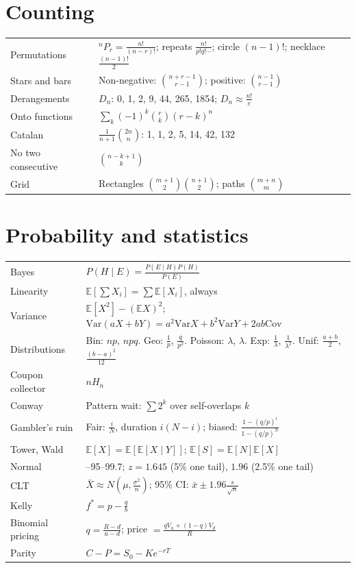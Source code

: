 \documentclass[11pt,a4paper,openany]{report}
\newcommand{\C}[2]{\binom{#1}{#2}}
\newcommand{\E}{\mathbb{E}}
\begin{document}
\section*{Counting}
\begin{tabular}{>{\raggedright}p{5.4cm}>{\raggedright\arraybackslash}p{9.6cm}}
\toprule
Permutations & $^nP_r=\frac{n!}{(n-r)!}$; repeats $\frac{n!}{p!q!\cdots}$; circle $(n-1)!$; necklace $\frac{(n-1)!}2$\\
Stars and bars & Non-negative: $\C{n+r-1}{r-1}$; positive: $\C{n-1}{r-1}$\\
Derangements & $D_n$: 0, 1, 2, 9, 44, 265, 1854; $D_n\approx\frac{n!}e$\\
Onto functions & $\sum_k(-1)^k\C rk(r-k)^n$\\
Catalan & $\frac1{n+1}\C{2n}n$: 1, 1, 2, 5, 14, 42, 132\\
No two consecutive & $\C{n-k+1}k$\\
Grid & Rectangles $\C{m+1}2\C{n+1}2$; paths $\C{m+n}m$\\
\bottomrule
\end{tabular}

\section*{Probability and statistics}
\begin{tabular}{>{\raggedright}p{5.4cm}>{\raggedright\arraybackslash}p{9.6cm}}
\toprule
Bayes & $P(H\mid E)=\frac{P(E\mid H)P(H)}{P(E)}$\\
Linearity & $\E[\sum X_i]=\sum\E[X_i]$, always\\
Variance & $\E[X^2]-(\E X)^2$; $\text{Var}(aX+bY)=a^2\text{Var}X+b^2\text{Var}Y+2ab\text{Cov}$\\
Distributions & Bin: $np$, $npq$. Geo: $\frac1p$, $\frac q{p^2}$. Poisson: $\lambda$, $\lambda$. Exp: $\frac1\lambda$, $\frac1{\lambda^2}$. Unif: $\frac{a+b}2$, $\frac{(b-a)^2}{12}$\\
Coupon collector & $nH_n$\\
Conway & Pattern wait: $\sum 2^k$ over self-overlaps $k$\\
Gambler's ruin & Fair: $\frac iN$, duration $i(N-i)$; biased: $\frac{1-(q/p)^i}{1-(q/p)^N}$\\
Tower, Wald & $\E[X]=\E[\E[X\mid Y]]$; $\E[S]=\E[N]\E[X]$\\
Normal & 68--95--99.7; $z=1.645$ (5\% one tail), $1.96$ (2.5\% one tail)\\
CLT & $\bar X\approx N(\mu,\frac{\sigma^2}n)$; 95\% CI: $\bar x\pm1.96\frac s{\sqrt n}$\\
Kelly & $f^*=p-\frac qb$\\
Binomial pricing & $q=\frac{R-d}{u-d}$; price $=\frac{qV_u+(1-q)V_d}R$\\
Parity & $C-P=S_0-Ke^{-rT}$\\
\bottomrule
\end{tabular}
\normalsize
\end{document}
